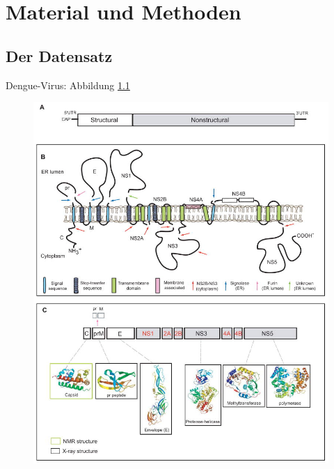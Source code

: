 \documentclass[german,version-2022-01]{uzl-thesis}
\begin{document}
%



%

\chapter{Material und Methoden}%
\label{chapter-use}

\section{Der Datensatz}
Dengue-Virus: Abbildung \ref{fig:Dengue_virus_overview} \\
\begin{figure}[htpb]
  \centering
  \includegraphics[scale=1]{Images/Dengue_virus_overview.jpg}
  \caption{ \cite{perera_structural_2008}}
  \label{fig:Dengue_virus_overview}
\end{figure} \\
\end{document}
